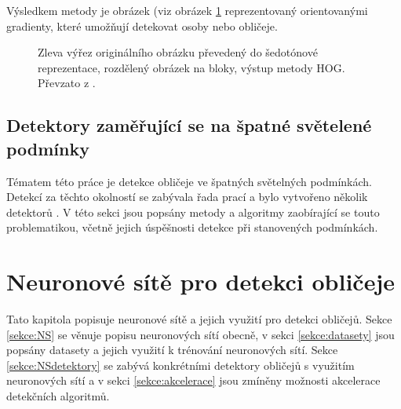 Výsledkem metody je obrázek (viz obrázek \ref{hogexample} reprezentovaný orientovanými gradienty, které umožňují detekovat osoby nebo obličeje.

\begin{figure}[H]
  \begin{center}
  \label{hogexample}
  \caption{Zleva výřez originálního obrázku převedený do šedotónové reprezentace, rozdělený obrázek na bloky, výstup metody HOG. Převzato z \cite{hog2}.}
  \end{center}
\end{figure}


\section{Detektory zaměřující se na špatné světelené podmínky}
Tématem této práce je detekce obličeje ve špatných světelných podmínkách. Detekcí za těchto okolností se zabývala řada prací a bylo vytvořeno několik detektorů . V této sekci jsou popsány metody a algoritmy zaobírající se touto problematikou, včetně jejich úspěšnosti detekce při stanovených podmínkách.



\chapter{Neuronové sítě pro detekci obličeje}
Tato kapitola popisuje neuronové sítě a jejich využití pro detekci obličejů. Sekce \ref{sekce:NS} se věnuje popisu neuronových sítí obecně, v sekci \ref{sekce:datasety} jsou popsány datasety a jejich využití k trénování neuronových sítí. Sekce \ref{sekce:NSdetektory} se zabývá konkrétními detektory obličejů s využitím neuronových sítí a v sekci \ref{sekce:akcelerace} jsou zmíněny možnosti akcelerace detekčních algoritmů.

